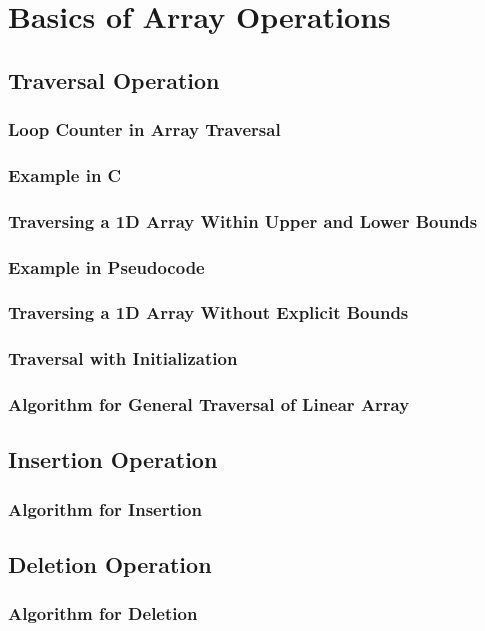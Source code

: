 \documentclass[12pt, oneside]{book}
\begin{document}
\chapter{Basics of Array Operations}
\section{Traversal Operation}
\subsection{Loop Counter in Array Traversal} 
\subsection{Example in C}
\subsection{Traversing a 1D Array Within Upper and Lower Bounds}
\subsection{ Example in Pseudocode}
\subsection{Traversing a 1D Array Without Explicit Bounds}
\subsection{Traversal with Initialization}
\subsection{Algorithm for General Traversal of Linear Array}
\section{Insertion Operation}
\subsection*{Algorithm for Insertion}
\section{Deletion Operation}
\subsection*{Algorithm for Deletion}
\end{document}
